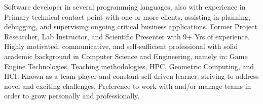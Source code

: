 

\begin{cvsummary}

Software developer in several programming languages, also with experience in Primary technical contact point with one or more clients, assisting in planning, debugging, and supervising ongoing critical business applications.
Former Project Researcher, Lab Instructor, and Scientific Presenter with 9+ Yrs of experience.
Highly motivated, communicative, and self-sufficient%
professional with solid academic background in Computer Science and Engineering, namely in: 
Game Engine Technologies, Teaching methodologies, HPC, Geometric Computing, and HCI.
Known as a team player %
and constant self-driven learner; 
striving to address novel and exciting challenges. %
Preference to work with and/or manage teams in order to grow personally and professionally.
\end{cvsummary}
